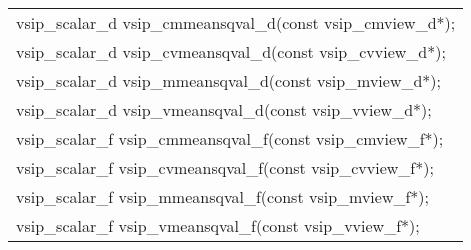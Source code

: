 \\\cvsiplh
\afh
\\\hspace*{.04\textwidth} {
\ttfamily
\begin{tabular}[H]{l}
vsip\_scalar\_d vsip\_cmmeansqval\_d(const vsip\_cmview\_d*);\\
vsip\_scalar\_d vsip\_cvmeansqval\_d(const vsip\_cvview\_d*);\\
vsip\_scalar\_d vsip\_mmeansqval\_d(const vsip\_mview\_d*);\\
vsip\_scalar\_d vsip\_vmeansqval\_d(const vsip\_vview\_d*);\\
vsip\_scalar\_f vsip\_cmmeansqval\_f(const vsip\_cmview\_f*);\\
vsip\_scalar\_f vsip\_cvmeansqval\_f(const vsip\_cvview\_f*);\\
vsip\_scalar\_f vsip\_mmeansqval\_f(const vsip\_mview\_f*);\\
vsip\_scalar\_f vsip\_vmeansqval\_f(const vsip\_vview\_f*);\\
\end{tabular}
}
\\\pyjvsiph
{}
